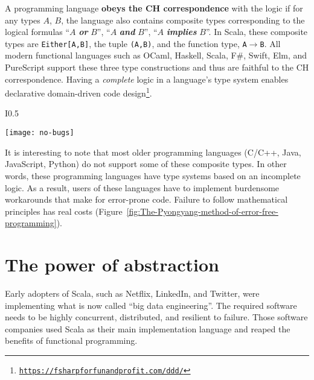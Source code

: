 A programming language \textbf{obeys the CH correspondence}
with the logic if for any types $A$, $B$, the language also contains
composite types corresponding to the logical formulas \textsf{``}$A$ \textbf{\emph{or}}
$B$\textsf{''}, \textsf{``}$A$ \textbf{\emph{and}} $B$\textsf{''}, \textsf{``}$A$ \textbf{\emph{implies}}
$B$\textsf{''}. In Scala, these composite types are \texttt{Either{[}A,B{]}},
the tuple \texttt{(A,B)}, and the function type, \texttt{A$\rightarrow$B}.
All modern functional languages such as OCaml, Haskell, Scala, F\#,
Swift, Elm, and PureScript support these three type constructions
and thus are faithful to the CH correspondence. Having a \emph{complete}
logic in a language\textsf{'}s type system enables declarative domain-driven
code design\footnote{\texttt{\href{https://fsharpforfunandprofit.com/ddd/}{https://fsharpforfunandprofit.com/ddd/}}}.

\begin{wrapfigure}{I}{0.5\columnwidth}%
\begin{centering}
\vspace{-0.5\baselineskip}
\texttt{[image: no-bugs]}\vspace{-0.5\baselineskip}
\par\end{centering}
\caption{The Pyongyang method of error-free software engineering.\label{fig:The-Pyongyang-method-of-error-free-programming}}
\vspace{-3\baselineskip}
\end{wrapfigure}%

It is interesting to note that most older programming languages (C/C++,
Java, JavaScript, Python) do not support some of these composite types.
In other words, these programming languages have type systems based
on an incomplete logic. As a result, users of these languages have
to implement burdensome workarounds that make for error-prone code.
Failure to follow mathematical principles has real costs (Figure~\ref{fig:The-Pyongyang-method-of-error-free-programming}).

\section{The power of abstraction}

Early adopters of Scala, such as Netflix, LinkedIn, and Twitter, were
implementing what is now called \textsf{``}big data engineering\textsf{''}. The required
software needs to be highly concurrent, distributed, and resilient
to failure. Those software companies used Scala as their main implementation
language and reaped the benefits of functional programming.

